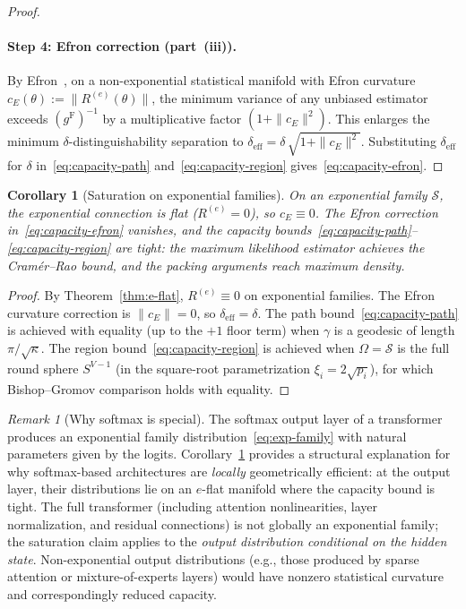 \documentclass[11pt]{article}
\newcommand{\gF}{g^{\mathrm{F}}}
\newtheorem{corollary}{Corollary}
\theoremstyle{remark}
\newtheorem{remark}{Remark}
\begin{document}
\begin{proof}
\paragraph{Step 4: Efron correction (part~(iii)).}
By Efron~\cite{efron1975}, on a non-exponential statistical manifold with
Efron curvature $c_E(\theta) := \|R^{(e)}(\theta)\|$, the minimum variance
of any unbiased estimator exceeds
$(\gF)^{-1}$ by a multiplicative factor $(1 + \|c_E\|^2)$.
This enlarges the minimum $\delta$-distinguishability separation to
$\delta_{\mathrm{eff}} = \delta\,\sqrt{1 + \|c_E\|^2}$.  Substituting
$\delta_{\mathrm{eff}}$ for $\delta$ in~\eqref{eq:capacity-path}
and~\eqref{eq:capacity-region} gives~\eqref{eq:capacity-efron}.
\end{proof}

\begin{corollary}[Saturation on exponential families]
\label{cor:saturation}
On an exponential family $\mathcal{S}$, the exponential connection is flat
($R^{(e)} = 0$), so $c_E \equiv 0$.  The Efron correction
in~\eqref{eq:capacity-efron} vanishes, and the capacity
bounds~\eqref{eq:capacity-path}--\eqref{eq:capacity-region} are tight: the
maximum likelihood estimator achieves the Cram\'er--Rao bound, and the
packing arguments reach maximum density.\end{corollary}

\begin{proof}
By Theorem~\ref{thm:e-flat}, $R^{(e)} \equiv 0$ on exponential families.
The Efron curvature correction is $\|c_E\| = 0$, so
$\delta_{\mathrm{eff}} = \delta$.
The path bound~\eqref{eq:capacity-path}
is achieved with equality (up to the $+1$ floor term) when $\gamma$ is a
geodesic of length $\pi/\sqrt{\kappa}$.
The region bound~\eqref{eq:capacity-region} is achieved when
$\Omega = \mathcal{S}$ is the full round sphere $S^{V-1}$
(in the square-root parametrization $\xi_i = 2\sqrt{p_i}$), for which
Bishop--Gromov comparison holds with equality.
\end{proof}


\begin{remark}[Why softmax is special]\label{rmk:softmax}
The softmax output layer of a transformer produces an exponential family
distribution~\eqref{eq:exp-family} with natural parameters given by the logits.
Corollary~\ref{cor:saturation} provides a structural explanation for why
softmax-based architectures are \emph{locally} geometrically efficient: at the
output layer, their distributions lie on an $e$-flat manifold where the
capacity bound is tight.  The full transformer (including attention
nonlinearities, layer normalization, and residual connections) is not globally
an exponential family; the saturation claim applies to the
\emph{output distribution conditional on the hidden state}.
Non-exponential output distributions (e.g., those produced by sparse attention
or mixture-of-experts layers) would have nonzero statistical curvature and
correspondingly reduced capacity.
\end{remark}
\end{document}
